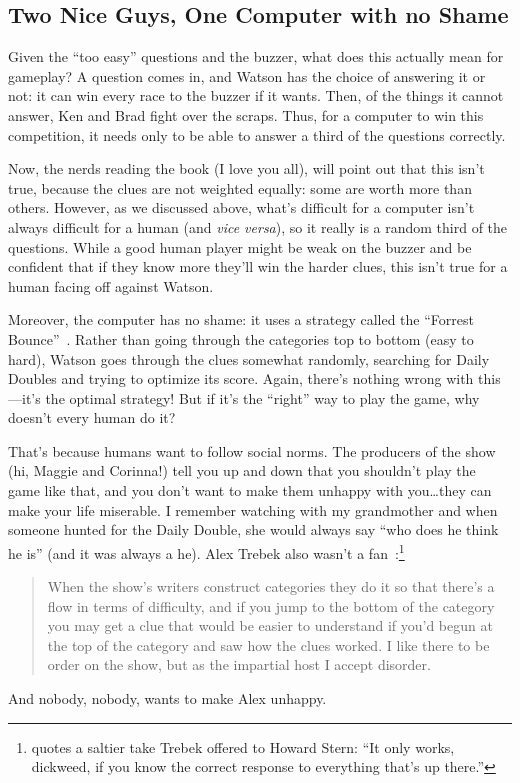 \subsection{Two Nice Guys, One Computer with no Shame}

Given the ``too easy'' questions and the buzzer, what does this
actually mean for gameplay?
%
A question comes in, and Watson has the choice of answering it or not:
it can win every race to the buzzer if it wants.
%
Then, of the things it cannot answer, Ken and Brad fight over the
scraps.
%
Thus, for a computer to win this competition, it needs only to be able
to answer a third of the questions correctly.

Now, the \jeopardy{} nerds reading the book (I love you all), will
point out that this isn't true, because the clues are not weighted
equally: some are worth more than others.
%
However, as we discussed above, what's difficult for a computer isn't
always difficult for a human (and \textit{vice versa}), so it really
is a random third of the questions.
%
While a good human player might be weak on the buzzer and be confident
that if they know more they'll win the harder clues, this isn't true
for a human facing off against Watson.

Moreover, the computer has no shame: it uses a strategy called the
``Forrest Bounce''~\citep[more infamously associated with James Holzhauer
and Arthur Chu]{rogak-20}.
%
Rather than going through the categories top to bottom (easy to hard),
Watson goes through the clues somewhat randomly, searching for Daily
Doubles and trying to optimize its score.
%
Again, there's nothing wrong with this---it's the optimal strategy!
%
But if it's the ``right'' way to play the game, why doesn't every
human do it?

That's because humans want to follow social norms.
%
The producers of the show (hi, Maggie and Corinna!) tell you up and
down that you shouldn't play the game like that, and you don't want to
make them unhappy with you\dots they can make your life miserable.
%
I remember watching \jeopardy{} with my grandmother and when someone
hunted for the Daily Double, she would always say ``who does he think
he is'' (and it was always a he).
%
Alex Trebek also wasn't a
fan~\citep{marchese-18}:\footnote{\citet{rogak-20} quotes a saltier
  take Trebek offered to Howard Stern: ``It only works, dickweed, if
  you know the correct response to everything that's up there.''}
%
\begin{quote}
  When the show's writers construct categories they do it so that
  there's a flow in terms of difficulty, and if you jump to the bottom
  of the category you may get a clue that would be easier to
  understand if you'd begun at the top of the category and saw how the
  clues worked. I like there to be order on the show, but as the
  impartial host I accept disorder.
\end{quote}
%
And nobody, nobody, wants to make Alex unhappy.

